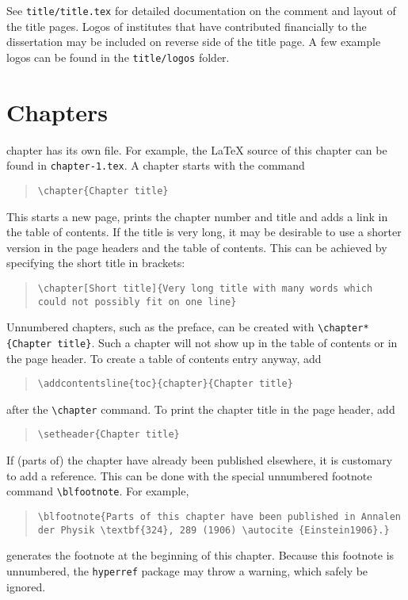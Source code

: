 See \texttt{title/title.tex} for detailed documentation on the comment and layout of the title pages.
Logos of institutes that have contributed financially to the dissertation may be included on reverse side of the title page.
A few example logos can be found in the \texttt{title/logos} folder.

\section{Chapters}

 chapter has its own file.
For example, the \LaTeX{} source of this chapter can be found in \texttt{chapter-1.tex}.
A chapter starts with the command

\begin{quote}
\texttt{\textbackslash chapter\{Chapter title\}}
\end{quote}
This starts a new page, prints the chapter number and title and adds a link in the table of contents.
If the title is very long, it may be desirable to use a shorter version in the page headers and the table of contents.
This can be achieved by specifying the short title in brackets:

\begin{quote}
\texttt{\textbackslash chapter[Short title]\{Very long title with many words which could not possibly fit on one line\}}
\end{quote}
Unnumbered chapters, such as the preface, can be created with \texttt{\textbackslash chapter*\{Chapter title\}}.
Such a chapter will not show up in the table of contents or in the page header.
To create a table of contents entry anyway, add
\begin{quote}
    \texttt{\textbackslash addcontentsline\{toc\}\{chapter\}\{Chapter title\}}
\end{quote}
after the \texttt{\textbackslash chapter} command.
To print the chapter title in the page header, add
\begin{quote}
    \texttt{\textbackslash setheader\{Chapter title\}}
\end{quote}

If (parts of) the chapter have already been published elsewhere, it is customary to add a reference.
This can be done with the special unnumbered footnote command \texttt{\textbackslash blfootnote}.
For example,

\begin{quote}
\texttt{\textbackslash blfootnote\{Parts of this chapter have been published in Annalen der Physik \textbackslash textbf\{324\}, 289 (1906) \textbackslash autocite \{Einstein1906\}.\}}
\end{quote}
generates the footnote at the beginning of this chapter.
Because this footnote is unnumbered, the \texttt{hyperref} package may throw a warning, which safely be ignored.

